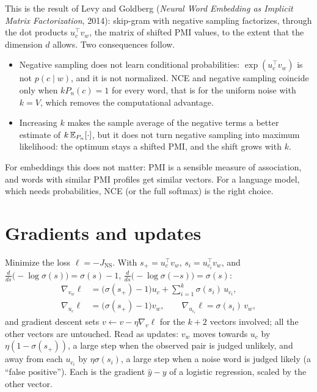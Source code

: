 \begin{notechapter}
This is the result of Levy and Goldberg (\emph{Neural Word Embedding as Implicit Matrix
Factorization}, 2014): skip-gram with negative sampling factorizes, through the dot products
$u_c^\top v_w$, the matrix of shifted PMI values, to the extent that the dimension $d$ allows. Two
consequences follow.
\begin{itemize}
  \item Negative sampling does not learn conditional probabilities: $\exp(u_c^\top v_w)$ is not $p(c\mid w)$, and it is
        not normalized. NCE and negative sampling coincide only when $kP_n(c) = 1$ for every word, that is
        for the uniform noise with $k = V$, which removes the computational advantage.
  \item Increasing $k$ makes the sample average of the negative terms a better estimate of
        $k\,\mathbb{E}_{P_n}[\cdot]$, but it does not turn negative sampling into maximum likelihood: the optimum stays
        a shifted PMI, and the shift grows with $k$.
\end{itemize}
For embeddings this does not matter: PMI is a sensible measure of association, and words with
similar PMI profiles get similar vectors. For a language model, which needs probabilities,
NCE (or the full softmax) is the right choice.

\section{Gradients and updates}\label{nce-negative-sampling:sec:gradients}

Minimize the loss $\ell = -J_{\mathrm{NS}}$. With $s_+ = u_c^\top v_w$, $s_i = u_{c_i}^\top v_w$, and $\frac{d}{ds}\bigl(-\log\sigma(s)\bigr) = \sigma(s) - 1$,
$\frac{d}{ds}\bigl(-\log\sigma(-s)\bigr) = \sigma(s)$:
\begin{align*}
  \nabla_{v_w}\ell &= \bigl(\sigma(s_+) - 1\bigr)u_c + \sum_{i=1}^k\sigma(s_i)\,u_{c_i},\\
  \nabla_{u_c}\ell &= \bigl(\sigma(s_+) - 1\bigr)v_w,\qquad\nabla_{u_{c_i}}\ell = \sigma(s_i)\,v_w,
\end{align*}
and gradient descent sets $v\leftarrow v - \eta\nabla_v\ell$ for the $k + 2$ vectors involved; all the other vectors are
untouched. Read as updates: $v_w$ moves towards $u_c$ by $\eta(1 - \sigma(s_+))$, a large step when the observed pair is
judged unlikely, and away from each $u_{c_i}$ by $\eta\sigma(s_i)$, a large step when a noise word is judged likely
(a ``false positive''). Each is the gradient $\hat y - y$ of a logistic regression, scaled by the other
vector.


\end{notechapter}
